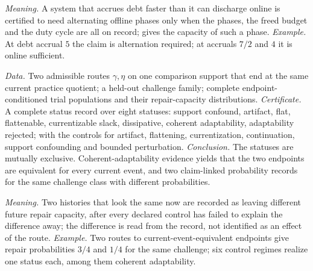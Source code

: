 \emph{Meaning.} A system that accrues debt faster than it can discharge online is certified to need
alternating offline phases only when the phases, the freed budget and the duty cycle are all on
record;  gives the capacity of such a phase.
\emph{Example.} At debt accrual $5$ the claim is alternation required; at accruals $7/2$ and $4$ it is
online sufficient.

\begin{schema}[E16: adaptability]\label{tmpl:e16}
\emph{Data.} Two admissible routes $\gamma, \eta$ on one comparison support that end at the same
current practice quotient; a held-out challenge family; complete endpoint-conditioned trial
populations and their repair-capacity distributions.
\emph{Certificate.} A complete status record over eight statuses: support confound, artifact, flat,
flattenable, currentizable slack, dissipative, coherent adaptability, adaptability rejected; with the
controls for artifact, flattening, currentization, continuation, support confounding and bounded
perturbation.
\emph{Conclusion.} The statuses are mutually exclusive. Coherent-adaptability evidence yields that the
two endpoints are equivalent for every current event, and two claim-linked probability records for
the same challenge class with different probabilities.
\end{schema}

\emph{Meaning.} Two histories that look the same now are recorded as leaving different future
repair capacity, after every declared control has failed to explain the difference away; the
difference is read from the record, not identified as an effect of the route.
\emph{Example.} Two routes to current-event-equivalent endpoints give repair probabilities $3/4$ and
$1/4$ for the same challenge; six control regimes realize one status each, among them coherent
adaptability.
